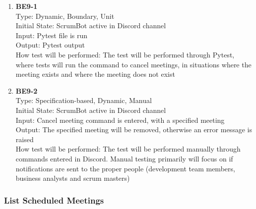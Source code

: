 \documentclass[12pt, titlepage]{article}
\begin{document}
\begin{enumerate}
    \item{\textbf{BE9-1}}\\
    Type: Dynamic, Boundary, Unit\\
    Initial State: ScrumBot active in Discord channel\\
    Input: Pytest file is run\\
    Output: Pytest output\\
    How test will be performed: The test will be performed through Pytest, where tests will run the command to cancel meetings, in situations where the meeting exists and where the meeting does not exist\\
    
    \item{\textbf{BE9-2}}\\
    Type: Specification-based, Dynamic, Manual\\
    Initial State: ScrumBot active in Discord channel\\
    Input: Cancel meeting command is entered, with a specified meeting\\
    Output: The specified meeting will be removed, otherwise an error message is raised\\
    How test will be performed: The test will be performed manually through commands entered in Discord. Manual testing primarily will focus on if notifications are sent to the proper people (development team members, business analysts and scrum masters)\\
\end{enumerate}

\subsubsection{List Scheduled Meetings}
\end{document}
